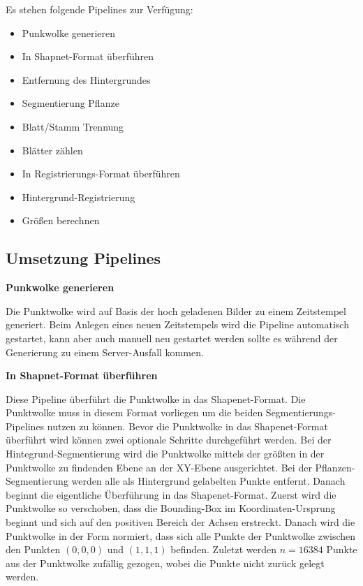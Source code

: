 \documentclass[12pt,titlepage, twoside]{article}
\begin{document}
Es stehen folgende Pipelines zur Verfügung:

\begin{itemize}
\item Punkwolke generieren
\item In Shapnet-Format überführen
\item Entfernung des Hintergrundes
\item Segmentierung Pflanze
\item Blatt/Stamm Trennung
\item Blätter zählen
\item In Registrierungs-Format überführen
\item Hintergrund-Registrierung
\item Größen berechnen
\end{itemize}


\subsection{Umsetzung Pipelines}
\label{sec:realisierung:implementierung5}

\textbf{Punkwolke generieren}

Die Punktwolke wird auf Basis der hoch geladenen Bilder zu einem Zeitstempel generiert. Beim Anlegen eines neuen Zeitstempels wird die Pipeline automatisch gestartet, kann aber auch manuell neu gestartet werden sollte es während der Generierung zu einem Server-Ausfall kommen.

\textbf{In Shapnet-Format überführen}


Diese Pipeline überführt die Punktwolke in das Shapenet-Format. Die Punktwolke muss in diesem Format vorliegen um die beiden Segmentierungs-Pipelines nutzen zu können.
Bevor die Punktwolke in das Shapenet-Format überführt wird können zwei optionale Schritte durchgeführt werden.
Bei der Hintegrund-Segmentierung wird die Punktwolke mittels der größten in der Punktwolke zu findenden Ebene an der XY-Ebene ausgerichtet.
Bei der Pflanzen-Segmentierung werden alle als Hintergrund gelabelten Punkte entfernt. Danach beginnt die eigentliche Überführung in das Shapenet-Format.
Zuerst wird die Punktwolke so verschoben, dass die Bounding-Box im Koordinaten-Ursprung beginnt und sich auf den positiven Bereich der Achsen erstreckt.
Danach wird die Punktwolke in der Form normiert, dass sich alle Punkte der Punktwolke zwischen den Punkten $(0,0,0)$ und $(1,1,1)$ befinden.
Zuletzt werden $n=16384$ Punkte aus der Punktwolke zufällig gezogen, wobei die Punkte nicht zurück gelegt werden.
\end{document}
